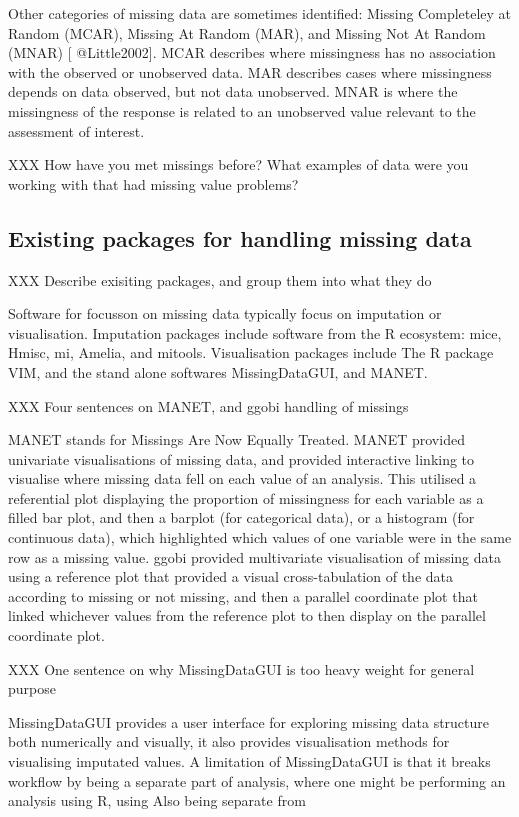 \documentclass[]{article}
\begin{document}
Other categories of missing data are sometimes identified: Missing
Completeley at Random (MCAR), Missing At Random (MAR), and Missing Not
At Random (MNAR) {[} @Little2002{]}. MCAR describes where missingness
has no association with the observed or unobserved data. MAR describes
cases where missingness depends on data observed, but not data
unobserved. MNAR is where the missingness of the response is related to
an unobserved value relevant to the assessment of interest.

XXX How have you met missings before? What examples of data were you
working with that had missing value problems?

\subsection{Existing packages for handling missing
data}\label{existing-packages-for-handling-missing-data}

XXX Describe exisiting packages, and group them into what they do

Software for focusson on missing data typically focus on imputation or
visualisation. Imputation packages include software from the R
ecosystem: mice, Hmisc, mi, Amelia, and mitools. Visualisation packages
include The R package VIM, and the stand alone softwares MissingDataGUI,
and MANET.

XXX Four sentences on MANET, and ggobi handling of missings

MANET stands for Missings Are Now Equally Treated. MANET provided
univariate visualisations of missing data, and provided interactive
linking to visualise where missing data fell on each value of an
analysis. This utilised a referential plot displaying the proportion of
missingness for each variable as a filled bar plot, and then a barplot
(for categorical data), or a histogram (for continuous data), which
highlighted which values of one variable were in the same row as a
missing value. ggobi provided multivariate visualisation of missing data
using a reference plot that provided a visual cross-tabulation of the
data according to missing or not missing, and then a parallel coordinate
plot that linked whichever values from the reference plot to then
display on the parallel coordinate plot.

XXX One sentence on why MissingDataGUI is too heavy weight for general
purpose

MissingDataGUI provides a user interface for exploring missing data
structure both numerically and visually, it also provides visualisation
methods for visualising imputated values. A limitation of MissingDataGUI
is that it breaks workflow by being a separate part of analysis, where
one might be performing an analysis using R, using Also being separate
from
\end{document}

